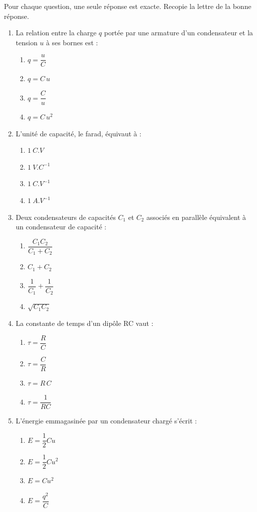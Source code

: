 \documentclass[11pt]{article}
\begin{document}
\begin{exercice}
Pour chaque question, une seule réponse est exacte. Recopie la lettre de la bonne réponse.
\begin{enumerate}
\item La relation entre la charge $q$ portée par une armature d'un condensateur et la tension $u$ à ses bornes est :
\begin{enumerate}
\item $q = \dfrac{u}{C}$ \qquad \item $q = C\,u$ \qquad \item $q = \dfrac{C}{u}$ \qquad \item $q = C\,u^2$
\end{enumerate}
\item L'unité de capacité, le farad, équivaut à :
\begin{enumerate}
\item $\SI{1}{C.V}$ \qquad \item $\SI{1}{V.C^{-1}}$ \qquad \item $\SI{1}{C.V^{-1}}$ \qquad \item $\SI{1}{A.V^{-1}}$
\end{enumerate}
\item Deux condensateurs de capacités $C_1$ et $C_2$ associés en parallèle équivalent à un condensateur de capacité :
\begin{enumerate}
\item $\dfrac{C_1 C_2}{C_1 + C_2}$ \qquad \item $C_1 + C_2$ \qquad \item $\dfrac{1}{C_1} + \dfrac{1}{C_2}$ \qquad \item $\sqrt{C_1 C_2}$
\end{enumerate}
\item La constante de temps d'un dipôle RC vaut :
\begin{enumerate}
\item $\tau = \dfrac{R}{C}$ \qquad \item $\tau = \dfrac{C}{R}$ \qquad \item $\tau = R\,C$ \qquad \item $\tau = \dfrac{1}{RC}$
\end{enumerate}
\item L'énergie emmagasinée par un condensateur chargé s'écrit :
\begin{enumerate}
\item $E = \dfrac{1}{2} C u$ \qquad \item $E = \dfrac{1}{2} C u^2$ \qquad \item $E = C u^2$ \qquad \item $E = \dfrac{q^2}{C}$
\end{enumerate}
\end{enumerate}
\end{exercice}
\end{document}
